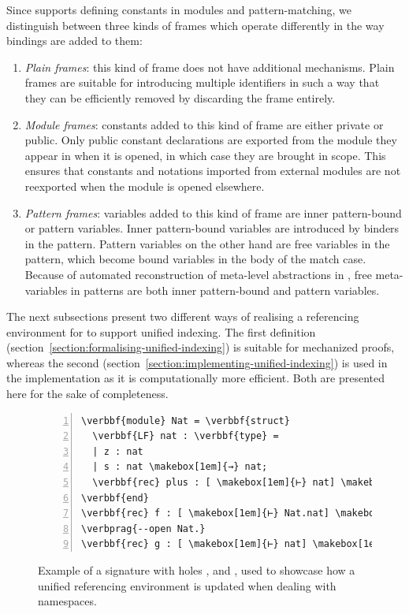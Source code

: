 Since \Beluga supports defining constants in modules and pattern-matching, we distinguish between three kinds of frames which operate differently in the way bindings are added to them:
\begin{enumerate}
\item
\textit{Plain frames}: this kind of frame does not have additional mechanisms.
Plain frames are suitable for introducing multiple identifiers in such a way that they can be efficiently removed by discarding the frame entirely.
\item
\textit{Module frames}: constants added to this kind of frame are either private or public.
Only public constant declarations are exported from the module they appear in when it is opened, in which case they are brought in scope.
This ensures that constants and notations imported from external modules are not reexported when the module is opened elsewhere.
\item
\textit{Pattern frames}: variables added to this kind of frame are inner pattern-bound or pattern variables.
Inner pattern-bound variables are introduced by binders in the pattern.
Pattern variables on the other hand are free variables in the pattern, which become bound variables in the body of the match case.
Because of automated reconstruction of meta-level abstractions in \Beluga, free meta-variables in patterns are both inner pattern-bound and pattern variables.
\end{enumerate}

The next subsections present two different ways of realising a referencing environment for \Beluga to support unified indexing.
The first definition (section~\ref{section:formalising-unified-indexing}) is suitable for mechanized proofs, whereas the second (section~\ref{section:implementing-unified-indexing}) is used in the implementation as it is computationally more efficient.
Both are presented here for the sake of completeness.

\begin{figure}[H]
\begin{Verbatim}[commandchars=\\\{\}, baselinestretch=1, numbers=left]
\verbbf{module} Nat = \verbbf{struct}
  \verbbf{LF} nat : \verbbf{type} =
  | z : nat
  | s : nat \makebox[1em]{→} nat;
  \verbbf{rec} plus : [ \makebox[1em]{⊢} nat] \makebox[1em]{→} [ \makebox[1em]{⊢} nat] \makebox[1em]{→} [ \makebox[1em]{⊢} nat] = \verbhole{?h1};
\verbbf{end}
\verbbf{rec} f : [ \makebox[1em]{⊢} Nat.nat] \makebox[1em]{→} [ \makebox[1em]{⊢} Nat.nat] = \verbhole{?h2};
\verbprag{--open Nat.}
\verbbf{rec} g : [ \makebox[1em]{⊢} nat] \makebox[1em]{→} [ \makebox[1em]{⊢} nat] = \verbhole{?h3};
\end{Verbatim}
\caption[Example \Beluga signature with holes]{%
Example of a \Beluga signature with holes \texttt{}, \texttt{} and \texttt{}, used to showcase how a unified referencing environment is updated when dealing with namespaces.
}
\label{figure:referencing-environment-example}
\end{figure}

